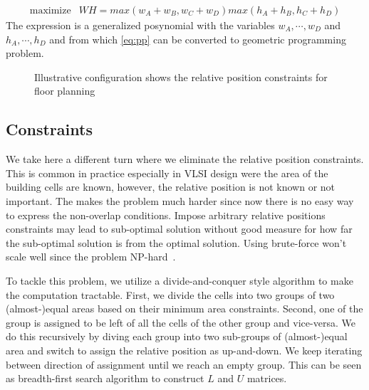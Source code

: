 \documentclass[12pt] {article}
\begin{document}
\[
\begin{array}{cl}
\text{maximize}   & WH = max(w_{A}+w_{B}, w_{C}+w_{D})max(h_{A}+h_{B}, h_{C}+h_{D})
\end{array} 
\]
The expression is a generalized posynomial with the variables $w_{A},\cdots, w_{D}$ and $h_{A},\cdots, h_{D}$ and from which \ref{eq:pp} can be converted to geometric programming  problem. 
\begin{figure}[!tbh]
\centering        
   \caption{Illustrative configuration shows the relative position constraints for floor planning}
   \label{fig:config}
\end{figure}

\subsection*{Constraints}
We take here a different turn where we eliminate the relative position constraints. This is common in practice especially in VLSI design were the area of the building cells are known, however, the relative position is not known or not important. The makes the problem much harder since now there is no easy way to express the non-overlap conditions. Impose arbitrary relative positions constraints may lead to sub-optimal solution without good measure for how far the sub-optimal solution is from the optimal solution. Using brute-force won't scale well since the problem NP-hard~\citep{boyd2004convex}. 

To tackle this problem, we utilize a divide-and-conquer style algorithm to make the computation tractable. First, we divide the cells into two groups of two (almost-)equal areas based on their minimum area constraints. Second, one of the group is assigned to be left of all the cells of the other group and vice-versa. We do this recursively by diving each group into two sub-groups of (almost-)equal area and switch to assign the relative position as up-and-down. We keep iterating between direction of assignment until we reach an empty group. This can be seen as breadth-first search algorithm to construct $L$ and $U$ matrices.
\end{document}
